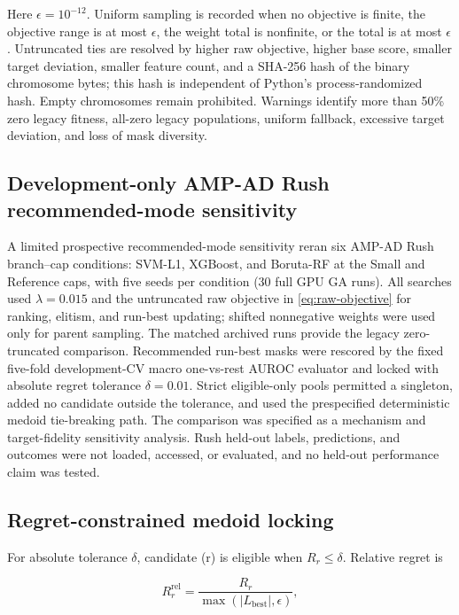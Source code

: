 Here \(\epsilon=10^{-12}\). Uniform sampling is recorded when no objective is finite, the objective range is at most \(\epsilon\), the weight total is nonfinite, or the total is at most \(\epsilon\). Untruncated ties are resolved by higher raw objective, higher base score, smaller target deviation, smaller feature count, and a SHA-256 hash of the binary chromosome bytes; this hash is independent of Python's process-randomized hash. Empty chromosomes remain prohibited. Warnings identify more than 50\% zero legacy fitness, all-zero legacy populations, uniform fallback, excessive target deviation, and loss of mask diversity.

\subsection{Development-only AMP-AD Rush recommended-mode sensitivity}

A limited prospective recommended-mode sensitivity reran six AMP-AD Rush branch--cap conditions: SVM-L1, XGBoost, and Boruta-RF at the Small and Reference caps, with five seeds per condition (30 full GPU GA runs). All searches used \(\lambda=0.015\) and the untruncated raw objective in \cref{eq:raw-objective} for ranking, elitism, and run-best updating; shifted nonnegative weights were used only for parent sampling. The matched archived runs provide the legacy zero-truncated comparison. Recommended run-best masks were rescored by the fixed five-fold development-CV macro one-vs-rest AUROC evaluator and locked with absolute regret tolerance \(\delta=0.01\). Strict eligible-only pools permitted a singleton, added no candidate outside the tolerance, and used the prespecified deterministic medoid tie-breaking path. The comparison was specified as a mechanism and target-fidelity sensitivity analysis. Rush held-out labels, predictions, and outcomes were not loaded, accessed, or evaluated, and no held-out performance claim was tested.

\subsection{Regret-constrained medoid locking}

For absolute tolerance \(\delta\), candidate (r) is eligible when \(R_r\le\delta\). Relative regret is

\begin{equation}
R_r^{\mathrm{rel}}=\frac{R_r}{\max(|L_{\mathrm{best}}|,\epsilon)},
\label{eq:relative-regret}
\end{equation}

